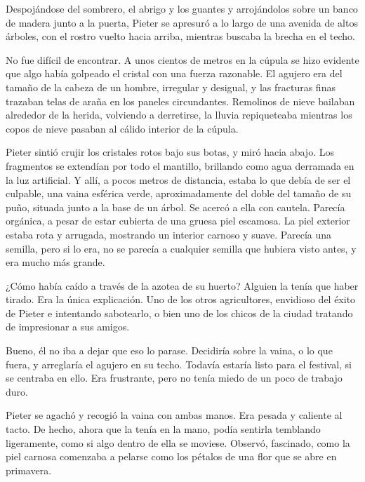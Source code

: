 Despojándose del sombrero, el abrigo y los guantes y arrojándolos sobre un banco de madera junto a la puerta, Pieter se apresuró a lo largo de una avenida de altos árboles, con el rostro vuelto hacia arriba, mientras buscaba la brecha en el techo.



No fue difícil de encontrar. A unos cientos de metros en la cúpula se hizo evidente que algo había golpeado el cristal con una fuerza razonable. El agujero era del tamaño de la cabeza de un hombre, irregular y desigual, y las fracturas finas trazaban telas de araña en los paneles circundantes. Remolinos de nieve bailaban alrededor de la herida, volviendo a derretirse, la lluvia repiqueteaba mientras los copos de nieve pasaban al cálido interior de la cúpula.



Pieter sintió crujir los cristales rotos bajo sus botas, y miró hacia abajo. Los fragmentos se extendían por todo el mantillo, brillando como agua derramada en la luz artificial. Y allí, a pocos metros de distancia, estaba lo que debía de ser el culpable, una vaina esférica verde, aproximadamente del doble del tamaño de su puño, situada junto a la base de un árbol. Se acercó a ella con cautela. Parecía orgánica, a pesar de estar cubierta de una gruesa piel escamosa. La piel exterior estaba rota y arrugada, mostrando un interior carnoso y suave. Parecía una semilla, pero si lo era, no se parecía a cualquier semilla que hubiera visto antes, y era mucho más grande.



¿Cómo había caído a través de la azotea de su huerto? Alguien la tenía que haber tirado. Era la única explicación. Uno de los otros agricultores, envidioso del éxito de Pieter e intentando sabotearlo, o bien uno de los chicos de la ciudad tratando de impresionar a sus amigos.



Bueno, él no iba a dejar que eso lo parase. Decidiría sobre la vaina, o lo que fuera, y arreglaría el agujero en su techo. Todavía estaría listo para el festival, si se centraba en ello. Era frustrante, pero no tenía miedo de un poco de trabajo duro.



Pieter se agachó y recogió la vaina con ambas manos. Era pesada y caliente al tacto. De hecho, ahora que la tenía en la mano, podía sentirla temblando ligeramente, como si algo dentro de ella se moviese. Observó, fascinado, como la piel carnosa comenzaba a pelarse como los pétalos de una flor que se abre en primavera.



